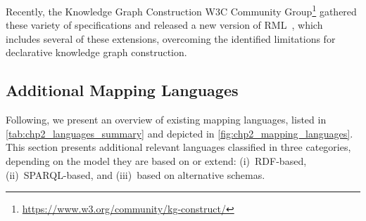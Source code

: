 Recently, the Knowledge Graph Construction W3C Community Group\footnote{\url{https://www.w3.org/community/kg-construct/}} gathered these variety of specifications and released a new version of RML~\parencite{iglesias2023rml}, which includes several of these extensions, overcoming the identified limitations for declarative knowledge graph construction.




\subsection{Additional Mapping Languages}
\label{sec:chp2_more-languages}

Following, we present an overview of existing mapping languages, listed in \cref{tab:chp2_languages_summary} and depicted in  \cref{fig:chp2_mapping_languages}. This section presents additional relevant languages classified in three categories, depending on the model they are based on or extend: (i)~RDF-based, (ii)~SPARQL-based, and (iii)~based on alternative schemas.


